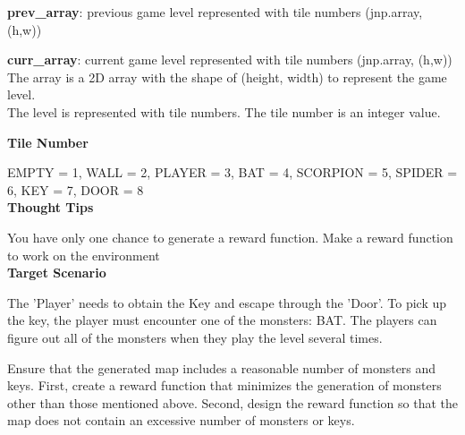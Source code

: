 \begin{tcolorbox}[colback=white, colframe=gray, title=Reward Refinement, breakable]
\textbf{prev\_array}:  previous game level represented with tile numbers (jnp.array, (h,w))

\textbf{curr\_array}: current game level represented with tile numbers (jnp.array, (h,w))\\
The array is a 2D array with the shape of (height, width) to represent the game level.\\

The level is represented with tile numbers. The tile number is an integer value.

\textbf{Tile Number}

EMPTY = 1, WALL = 2, PLAYER = 3, BAT = 4, SCORPION = 5, SPIDER = 6, KEY = 7, DOOR = 8\\


\textbf{Thought Tips}

You have only one chance to generate a reward function. Make a reward function to work on the environment \\

\textbf{Target Scenario}

The 'Player' needs to obtain the Key and escape through the 'Door'. To pick up the key, the player must encounter one of the monsters: BAT. The players can figure out all of the monsters when they play the level several times.

Ensure that the generated map includes a reasonable number of monsters and keys.
First, create a reward function that minimizes the generation of monsters other than those mentioned above.
Second, design the reward function so that the map does not contain an excessive number of monsters or keys.\\

\end{tcolorbox}

\vspace{1em}

